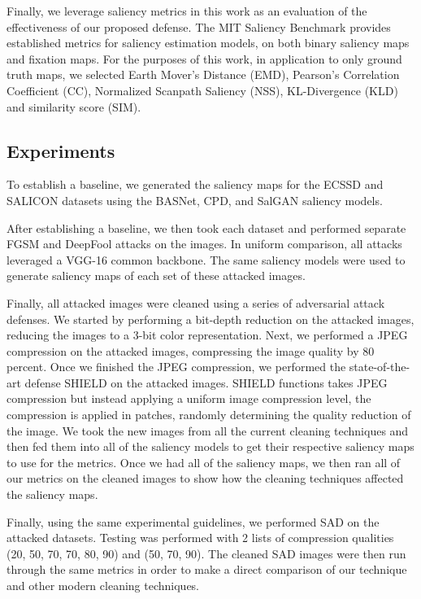 \documentclass[10pt,twocolumn,letterpaper]{article}
\begin{document}
Finally, we leverage saliency metrics in this work as an evaluation of the effectiveness of our proposed defense.
The MIT Saliency Benchmark \cite{mit-saliency-benchmark} provides established metrics for saliency estimation models, on both binary saliency maps and fixation maps.
For the purposes of this work, in application to only ground truth maps, we selected Earth Mover's Distance (EMD), Pearson's Correlation Coefficient (CC), Normalized Scanpath Saliency (NSS), KL-Divergence (KLD) and similarity score (SIM).



\subsection{Experiments}
To establish a baseline, we generated the saliency maps for the ECSSD and SALICON datasets using the BASNet\cite{BASNet}, CPD\cite{wu2019cascaded}, and SalGAN\cite{Pan_2017_SalGAN} saliency models.

After establishing a baseline, we then took each dataset and performed separate FGSM and DeepFool attacks on the images.
In uniform comparison, all attacks leveraged a VGG-16 common backbone.
The same saliency models were used to generate saliency maps of each set of these attacked images.

Finally, all attacked images were cleaned using a series of adversarial attack defenses.
We started by performing a bit-depth reduction on the attacked images, reducing the images to a 3-bit color representation.
Next, we performed a JPEG compression on the attacked images, compressing the image quality by 80 percent. 
Once we finished the JPEG compression, we performed the state-of-the-art defense SHIELD on the attacked images. SHIELD functions takes JPEG compression but instead applying a uniform image compression level, the compression is applied in patches, randomly determining the quality reduction of the image.  
We took the new images from all the current cleaning techniques and then fed them into all of the saliency models to get their respective saliency maps to use for the metrics.
Once we had all of the saliency maps, we then ran all of our metrics on the cleaned images to show how the cleaning techniques affected the saliency maps. 

Finally, using the same experimental guidelines, we performed SAD on the attacked datasets. 
Testing was performed with 2 lists of compression qualities (20, 50, 70, 70, 80, 90) and (50, 70, 90).
The cleaned SAD images were then run through the same metrics in order to make a direct comparison of our technique and other modern cleaning techniques.  
\end{document}
